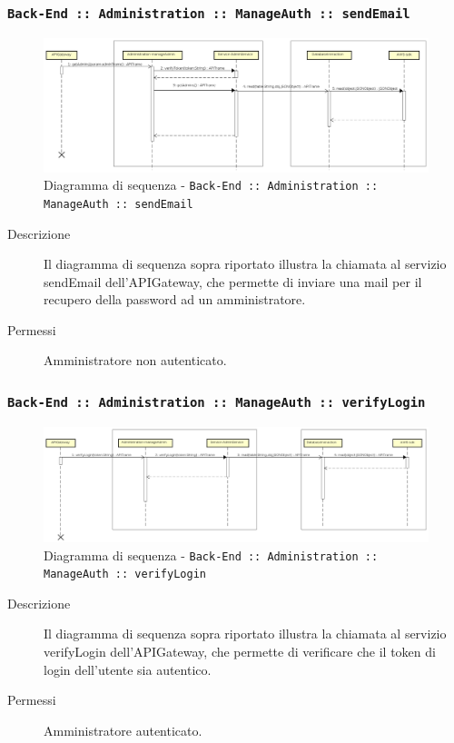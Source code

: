 \documentclass[../DefinizioneDiProdotto.tex]{subfiles}
\begin{document}
		\newpage
		\subsubsection{\texttt{Back-End :: Administration :: ManageAuth :: sendEmail}}
		\begin{figure}[!h]
			\centering
			\includegraphics[width=\textwidth]{DiagrammiSequenza/Back-End/manageAuth/sendEmail.png}
			\caption{Diagramma di sequenza - \texttt{Back-End :: Administration :: ManageAuth :: sendEmail }}
		\end{figure}
		\begin{description}
			\item [Descrizione] Il diagramma di sequenza sopra riportato illustra la chiamata al servizio sendEmail dell'APIGateway, che permette di inviare una mail per il recupero della password ad un amministratore.
			\item [Permessi] Amministratore non autenticato.
		\end{description}

		\subsubsection{\texttt{Back-End :: Administration :: ManageAuth :: verifyLogin}}
		\begin{figure}[!h]
			\centering
			\includegraphics[width=\textwidth]{DiagrammiSequenza/Back-End/manageAuth/verifyLogin.png}
			\caption{Diagramma di sequenza - \texttt{Back-End :: Administration :: ManageAuth :: verifyLogin }}
		\end{figure}
		\begin{description}
			\item [Descrizione] Il diagramma di sequenza sopra riportato illustra la chiamata al servizio verifyLogin dell'APIGateway, che permette di verificare che il token di login dell'utente sia autentico.
			\item [Permessi] Amministratore autenticato.
		\end{description}
\end{document}
